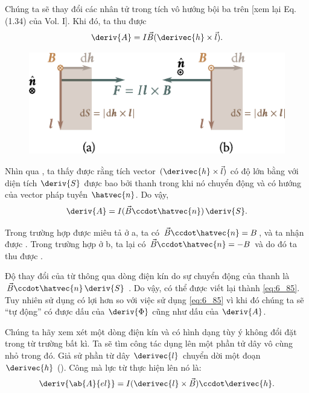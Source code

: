 \noindent
Chúng ta sẽ thay đổi các nhân tử trong tích vô hướng bội ba trên [xem lại Eq. (1.34) của Vol. I]. Khi đó, ta thu được
\begin{equation}\label{eq:6_87}
    \deriv{A} = I \vec{B} (\derivec{h} \times \vec{l}).
\end{equation}

\begin{figure}[t]
	\begin{center}
		\includegraphics[scale=1.1]{figures/ch_06/fig_6_22.pdf}
		\caption[]{}
		\label{fig:6_22}
	\end{center}
	\vspace{-0.8cm}
\end{figure}

Nhìn qua , ta thấy được rằng tích vector $(\derivec{h}\times\vec{l})$ có độ lớn bằng với diện tích $\deriv{S}$ được bao bởi thanh trong khi nó chuyển động và có hướng của vector pháp tuyến $\hatvec{n}$. Do vậy,
\begin{equation}\label{eq:6_88}
    \deriv{A} = I (\vec{B} \ccdot \hatvec{n})\, \deriv{S}.
\end{equation}

\noindent
Trong trường hợp được miêu tả ở a, ta có $\vec{B}\ccdot\hatvec{n}=B$, và ta nhận được . Trong trường hợp ở b, ta lại có $\vec{B}\ccdot\hatvec{n}=-B$ và do đó ta thu được .

Độ thay đổi của từ thông qua dòng điện kín do sự chuyển động của thanh là $\vec{B}\ccdot\hatvec{n}\,\deriv{S}$ . Do vậy,  có thể được viết lại thành \eqref{eq:6_85}. Tuy nhiên sử dụng  có lợi hơn so với việc sử dụng \eqref{eq:6_85} vì khi đó chúng ta sẽ ``tự động'' có được dấu của $\deriv{\Phi}$ cũng như dấu của $\deriv{A}$.

Chúng ta hãy xem xét một dòng điện kín và có hình dạng tùy ý không đổi đặt trong từ trường bất kì. Ta sẽ tìm công tác dụng lên một phần tử dây vô cùng nhỏ trong đó. Giả sử phần từ dây $\derivec{l}$ chuyển dời một đoạn $\derivec{h}$ (). Công mà lực từ thực hiện lên nó là:
\begin{equation}\label{eq:6_89}
    \deriv{\ab{A}{el}} = I (\derivec{l} \times \vec{B}) \ccdot \derivec{h}.
\end{equation}


